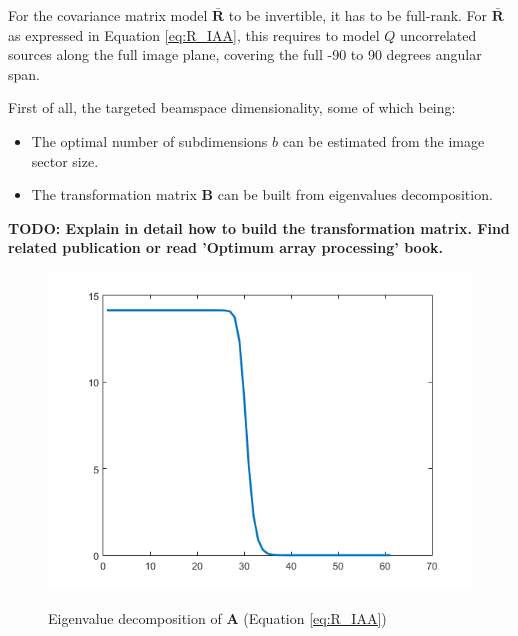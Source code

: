 \iffalse
For the covariance matrix model $\boldsymbol{\bar{R}}$ to be invertible, it has to be full-rank. For $\boldsymbol{\bar{R}}$ as expressed in Equation \ref{eq:R_IAA}, this requires to model $Q$ uncorrelated sources along the full image plane, covering the full -90 to 90 degrees angular span.

First of all, the targeted beamspace dimensionality, some of which being:
\begin{itemize}
    \item The optimal number of subdimensions $b$ can be estimated from the image sector size.
    \item The transformation matrix $\boldsymbol{B}$ can be built from eigenvalues decomposition.
\end{itemize}

\textbf{TODO: Explain in detail how to build the transformation matrix. Find related publication or read 'Optimum array processing' book.}


\begin{figure}[ht]
    \centering
    \includegraphics[width=\linewidth]{./images/background/eigenvalue_IAA.png}
    \label{fig:eigenvalue_IAA}
    \caption{Eigenvalue decomposition of \textbf{A} (Equation \ref{eq:R_IAA})}
\end{figure}


